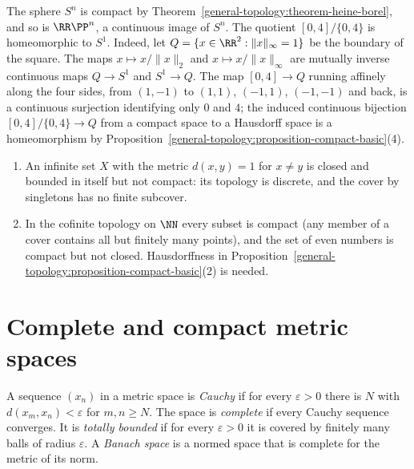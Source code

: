 \begin{example}\label{general-topology:example-circle}
The sphere $S^n$ is compact by Theorem~\ref{general-topology:theorem-heine-borel}, and so is $\RR\PP^n$, a continuous image of $S^n$. The quotient
$[0, 4]/\{0, 4\}$ is homeomorphic to $S^1$. Indeed, let $Q = \{x \in \RR^2 : \|x\|_\infty = 1\}$ be the boundary of the square. The maps
$x \mapsto x/\|x\|_2$ and $x \mapsto x/\|x\|_\infty$ are mutually inverse continuous maps $Q \to S^1$ and $S^1 \to Q$. The map $[0, 4] \to Q$ running
affinely along the four sides, from $(1, -1)$ to $(1, 1)$, $(-1, 1)$, $(-1, -1)$ and back, is a continuous surjection identifying only $0$ and $4$; the
induced continuous bijection $[0, 4]/\{0, 4\} \to Q$ from a compact space to a Hausdorff space is a homeomorphism by
Proposition~\ref{general-topology:proposition-compact-basic}(4).
\end{example}

\begin{counterexample}\label{general-topology:counterexample-compactness}
\begin{enumerate}
\item An infinite set $X$ with the metric $d(x, y) = 1$ for $x \neq y$ is closed and bounded in itself but not compact: its topology is discrete, and the
cover by singletons has no finite subcover.
\item In the cofinite topology on $\NN$ every subset is compact (any member of a cover contains all but finitely many points), and the set of even
numbers is compact but not closed. Hausdorffness in Proposition~\ref{general-topology:proposition-compact-basic}(2) is needed.
\end{enumerate}
\end{counterexample}

\section{Complete and compact metric spaces}\label{general-topology:section-complete}

\begin{definition}\label{general-topology:definition-complete}
A sequence $(x_n)$ in a metric space is \emph{Cauchy} if for every $\varepsilon > 0$ there is $N$ with $d(x_m, x_n) < \varepsilon$ for $m, n \geq N$.
The space is \emph{complete} if every Cauchy sequence converges. It is \emph{totally bounded} if for every $\varepsilon > 0$ it is covered by finitely
many balls of radius $\varepsilon$. A \emph{Banach space} is a normed space that is complete for the metric of its norm.
\end{definition}

